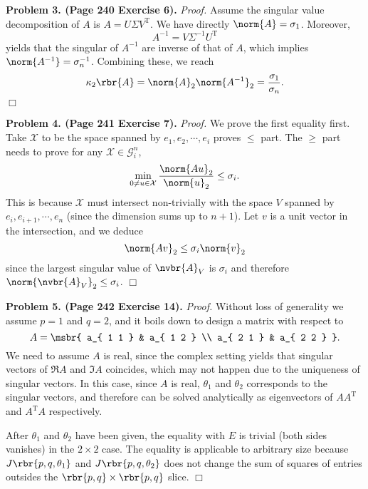 \documentclass[english, nochinese]{pnote}
\begin{document}
\textbf{Problem 3. (Page 240 Exercise 6).} \textit{Proof.} Assume the singular value decomposition of $A$ is $ A = U \Sigma V^{\text{T}} $. We have directly $ \norm{A} = \sigma_1 $. Moreover,
\begin{equation}
A^{-1} = V \Sigma^{-1} U^{\text{T}}
\end{equation}
yields that the singular of $A^{-1}$ are inverse of that of $A$, which implies $ \norm{A^{-1}} = \sigma_n^{-1} $. Combining these, we reach
\begin{equation}
\kappa_2 \rbr{A} = \norm{A}_2 \norm{A^{-1}}_2  = \frac{\sigma_1}{\sigma_n}.
\end{equation}
\hfill$\Box$

\textbf{Problem 4. (Page 241 Exercise 7).} \textit{Proof.} We prove the first equality first. Take $\mathcal{X}$ to be the space spanned by $ e_1, e_2, \cdots, e_i $ proves $\le$ part. The $\ge$ part needs to prove for any $ \mathcal{X} \in \mathcal{G}_i^n $,
\begin{equation}
\min_{ 0 \neq u \in \mathcal{X} } \frac{\norm{ A u }_2}{\norm{u}_2} \le \sigma_i.
\end{equation}
This is because $\mathcal{X}$ must intersect non-trivially with the space $V$ spanned by $ e_i, e_{ i + 1 }, \cdots, e_n $ (since the dimension sums up to $ n + 1 $). Let $v$ is a unit vector in the intersection, and we deduce
\begin{equation}
\norm{ A v }_2 \le \sigma_i \norm{v}_2
\end{equation}
since the largest singular value of $\nvbr{A}_V$ is $\sigma_i$ and therefore $ \norm{\nvbr{A}_V}_2 \le \sigma_i $.
\hfill$\Box$

\textbf{Problem 5. (Page 242 Exercise 14).} \textit{Proof.} Without loss of generality we assume $ p = 1 $ and $ q = 2 $, and it boils down to design a matrix with respect to
\begin{equation}
A = \msbr{ a_{ 1 1 } & a_{ 1 2 } \\ a_{ 2 1 } & a_{ 2 2 } }.
\end{equation}
We need to assume $A$ is real, since the complex setting yields that singular vectors of $ \Re A $ and $ \Im A $ coincides, which may not happen due to the uniqueness of singular vectors. In this case, since $A$ is real, $\theta_1$ and $\theta_2$ corresponds to the singular vectors, and therefore can be solved analytically as eigenvectors of $ A A^{\text{T}} $ and $ A^{\text{T}} A $ respectively.

After $\theta_1$ and $\theta_2$ have been given, the equality with $E$ is trivial (both sides vanishes) in the $ 2 \times 2 $ case. The equality is applicable to arbitrary size because $ J \rbr{ p, q, \theta_1 } $ and $ J \rbr{ p, q, \theta_2 } $ does not change the sum of squares of entries outsides the $ \rbr{ p, q } \times \rbr{ p, q } $ slice.
\hfill$\Box$
\end{document}
